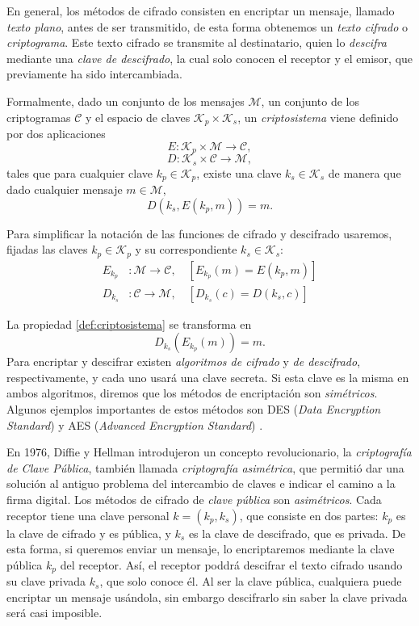 En general, los métodos de cifrado consisten en encriptar un mensaje, llamado \emph{texto plano}, antes de ser transmitido, de esta forma obtenemos un \emph{texto cifrado} o \emph{criptograma}. Este texto cifrado se transmite al destinatario, quien lo \emph{descifra} mediante una \emph{clave de descifrado}, la cual solo conocen el receptor y el emisor, que previamente ha sido intercambiada.

Formalmente, dado un conjunto de los mensajes $\mathcal{M}$, un conjunto de los criptogramas $\mathcal{C}$ y el espacio de claves $\mathcal{K}_p \times \mathcal{K}_s$, un \emph{criptosistema} viene definido por dos aplicaciones
\[
    E : \mathcal{K}_p \times \mathcal{M} \rightarrow \mathcal{C},
\]
\[
    D : \mathcal{K}_s \times \mathcal{C} \rightarrow \mathcal{M},
\]
tales que para cualquier clave $k_p \in \mathcal{K}_p$, existe una clave $k_s \in \mathcal{K}_s$ de manera que dado cualquier mensaje $m \in \mathcal{M}$,
\begin{equation}
    \label{def:criptosistema}
    D(k_s, E(k_p, m)) = m.
\end{equation}

Para simplificar la notación de las funciones de cifrado y descifrado usaremos, fijadas las claves $k_p \in \mathcal{K}_p$ y su correspondiente $k_s \in \mathcal{K}_s$:
\begin{align*} 
    E_{k_p} &: \mathcal{M} \rightarrow \mathcal{C}, \quad [ E_{k_p} (m) = E(k_p, m) ]\\ 
    D_{k_s} &: \mathcal{C} \rightarrow \mathcal{M}, \quad [ D_{k_s} (c) = D(k_s, c) ]
\end{align*}

La propiedad \ref{def:criptosistema} se transforma en
\[
    D_{k_s} \left( E_{k_p}(m) \right) = m.
\]
Para encriptar y descifrar existen \emph{algoritmos de cifrado} y \emph{de descifrado}, respectivamente, y cada uno usará una clave secreta. Si esta clave es la misma en ambos algoritmos, diremos que los métodos de encriptación son \emph{simétricos}. Algunos ejemplos importantes de estos métodos son DES (\emph{Data Encryption Standard}) y AES (\emph{Advanced Encryption Standard}) \cite[Sección 2.1]{Introduction_to_cryptography}.

En 1976, Diffie y Hellman \cite{Diffie_Hellman_1976} introdujeron un concepto revolucionario, la \emph{criptografía de Clave Pública}, también llamada \emph{criptografía asimétrica}, que permitió dar una solución al antiguo problema del intercambio de claves e indicar el camino a la firma digital. Los métodos de cifrado de \emph{clave pública} son \emph{asimétricos}. Cada receptor tiene una clave personal $k = (k_p, k_s)$, que consiste en dos partes: $k_p$ es la clave de cifrado y es pública, y $k_s$ es la clave de descifrado, que es privada. De esta forma, si queremos enviar un mensaje, lo encriptaremos mediante la clave pública $k_p$ del receptor. Así, el receptor poddrá descifrar el texto cifrado usando su clave privada $k_s$, que solo conoce él. Al ser la clave pública, cualquiera puede encriptar un mensaje usándola, sin embargo descifrarlo sin saber la clave privada será casi imposible.

